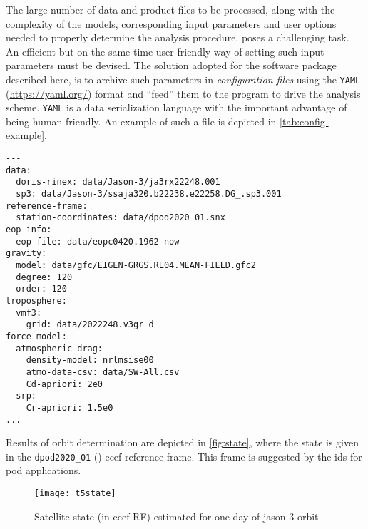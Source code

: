 The large number of data and product files to be processed, along with the complexity of 
the models, corresponding input parameters and user options needed to properly determine 
the analysis procedure, poses a challenging task. An efficient but on the same time 
user-friendly way of setting such input parameters must be devised. The solution adopted 
for the software package described here, is to archive such parameters in \emph{configuration files} 
using the \texttt{YAML} (\url{https://yaml.org/}) format and ``feed'' them to the 
program to drive the analysis scheme. \texttt{YAML} is a data serialization
language with the important advantage of being human-friendly. An example of such 
a file is depicted in \autoref{tab:config-example}.

\begin{adjustbox}{center, max width=\linewidth , fbox=0.5pt, captionbelow={Configuration file example.}, float=table}
\begin{BVerbatim}
---
data:
  doris-rinex: data/Jason-3/ja3rx22248.001
  sp3: data/Jason-3/ssaja320.b22238.e22258.DG_.sp3.001
reference-frame:
  station-coordinates: data/dpod2020_01.snx
eop-info:
  eop-file: data/eopc0420.1962-now
gravity:
  model: data/gfc/EIGEN-GRGS.RL04.MEAN-FIELD.gfc2
  degree: 120
  order: 120
troposphere:
  vmf3:
    grid: data/2022248.v3gr_d
force-model:
  atmospheric-drag:
    density-model: nrlmsise00
    atmo-data-csv: data/SW-All.csv
    Cd-apriori: 2e0
  srp:
    Cr-apriori: 1.5e0
...
\end{BVerbatim}
\label{tab:config-example}
\end{adjustbox}

Results of orbit determination are depicted in \autoref{fig:state}, where the state 
is given in the \texttt{dpod2020\_01} (\cite{Moreaux2023}) \gls{ecef} reference 
frame. This frame is suggested by the \gls{ids} for \gls{pod} applications.

\begin{figure}
    \centering
    \texttt{[image: t5state]}
    \caption{Satellite state (in \gls{ecef} RF) estimated for one day of \gls{jason}-3 orbit}
    \label{fig:state}
\end{figure}

